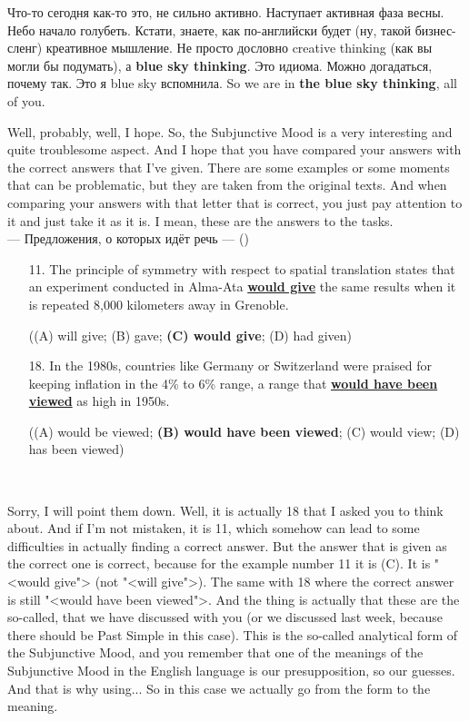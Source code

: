 \documentclass[main.tex]{subfiles}
\begin{document}

Что-то сегодня как-то это, не сильно активно.
Наступает активная фаза весны.
Небо начало голубеть.
Кстати, знаете, как по-английски будет (ну, такой бизнес-сленг) креативное мышление.
Не просто дословно creative thinking (как вы могли бы подумать), а \textbf{blue sky thinking}.
Это идиома.
Можно догадаться, почему так.
Это я blue sky вспомнила.
So we are in \textbf{the blue sky thinking}, all of you.



Well, probably, well, I hope.
So, the Subjunctive Mood is a very interesting and quite troublesome aspect.
And I hope that you have compared your answers with the correct answers that I've given.
There are some examples or some moments that can be problematic, but they are taken from the original texts.
And when comparing your answers with that letter that is correct, you just pay attention to it and just take it as it is.
I mean, these are the answers to the tasks.
\\

\hypertarget{ltask:2024-03-20-answers}{--- Предложения, о которых идёт речь ---} (\hyperref[task:2024-03-20]{\color{blue}{перейти к полному тексту задания}})
\\

\begin{enumerate}[nosep,leftmargin=*]
	\itemsep\eitsp
	\item[11.] The principle of symmetry with respect to spatial translation states that an experiment conducted in Alma-Ata \uline{\textbf{would give}} the same results when it is repeated 8,000 kilometers away in Grenoble.
		
		((A) will give; (B) gave; \textbf{(C) would give}; (D) had given)
	\item[18.] In the 1980s, countries like Germany or Switzerland were praised for keeping inflation in the 4\% to 6\% range, a range that \uline{\textbf{would have been viewed}} as high in 1950s.
		
		((A) would be viewed; \textbf{(B) would have been viewed}; (C) would view; (D) has been viewed)
\end{enumerate}
\ 

Sorry, I will point them down.
Well, it is actually 18 that I asked you to think about.
And if I'm not mistaken, it is 11, which somehow can lead to some difficulties in actually finding a correct answer.
But the answer that is given as the correct one is correct, because for the example number 11 it is (C).
It is "<would give"> (not "<will give">).
The same with 18 where the correct answer is still "<would have been viewed">.
And the thing is actually that these are the so-called, that we have discussed with you (or we discussed last week, because there should be Past Simple in this case).
This is the so-called analytical form of the Subjunctive Mood, and you remember that one of the meanings of the Subjunctive Mood in the English language is our presupposition, so our guesses.
And that is why using...
So in this case we actually go from the form to the meaning.
\end{document}
